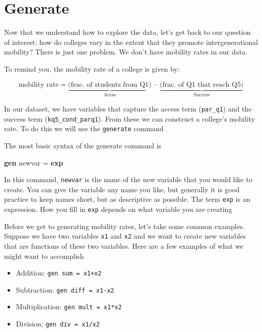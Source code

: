\documentclass[
]{book}
\newenvironment{Shaded}{\begin{snugshade}}{\end{snugshade}}
\newcommand{\FunctionTok}[1]{\textcolor[rgb]{0.13,0.29,0.53}{\textbf{#1}}}
\newcommand{\KeywordTok}[1]{\textcolor[rgb]{0.13,0.29,0.53}{\textbf{#1}}}
\newcommand{\NormalTok}[1]{#1}
\begin{document}
\section{Generate}\label{generate}

Now that we understand how to explore the data, let's get back to our question of interest: how do colleges vary in the extent that they promote intergenerational mobility? There is just one problem. We don't have mobility rates in our data.

To remind you, the mobility rate of a college is given by:

\[
\text{mobility rate}= \underbrace{\text{(frac. of students from Q1)}}_{\text{Acess}} \; \cdot \; \underbrace{\text{(frac. of Q1 that reach Q5)}}_{\text{Success}} \nonumber
\]

In our dataset, we have variables that capture the access term (\texttt{par\_q1}) and
the success term (\texttt{kq5\_cond\_parq1}). From these we can construct a college's mobility rate. To do this we will use the \texttt{generate} command

The most basic syntax of the generate command is

\begin{Shaded}
\begin{Highlighting}[]
\KeywordTok{gen}\NormalTok{ newvar = }\FunctionTok{exp}
\end{Highlighting}
\end{Shaded}

In this command, \texttt{newvar} is the name of the new variable that you would like to create. You can give the variable any name you like, but generally it is good practice to keep names short, but as descriptive as possible. The term \texttt{exp} is an expression. How you fill in \texttt{exp} depends on what variable you are creating

Before we get to generating mobility rates, let's take some common examples. Suppose we have two variables \texttt{x1} and \texttt{x2} and we want to create new variables that are functions of these two variables. Here are a few examples of what we might want to accomplish

\begin{itemize}
\item
  Addition: \texttt{gen\ sum\ =\ x1+x2}
\item
  Subtraction: \texttt{gen\ diff\ =\ x1-x2}
\item
  Multiplication: \texttt{gen\ mult\ =\ x1*x2}
\item
  Division: \texttt{gen\ div\ =\ x1/x2}
\end{itemize}
\end{document}
